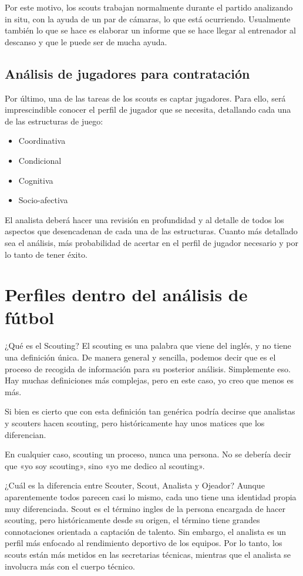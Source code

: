 Por este motivo, los scouts trabajan normalmente durante el partido analizando 
in situ, con la ayuda de un par de cámaras, lo que está 
ocurriendo. Usualmente también lo que se hace es elaborar un informe 
que se hace llegar al entrenador al descanso y que le puede ser 
de mucha ayuda.


\subsection{Análisis de jugadores para contratación}

Por último, una de las tareas de los scouts es captar jugadores. 
Para ello, será imprescindible conocer el perfil de jugador que 
se necesita, detallando cada una de las estructuras de juego:

\begin{itemize}
    \item Coordinativa
    \item Condicional
    \item Cognitiva
    \item Socio-afectiva
\end{itemize}

El analista deberá hacer una revisión en profundidad y al detalle de 
todos los aspectos que desencadenan de cada una de las estructuras. 
Cuanto más detallado sea el análisis, más probabilidad de acertar 
en el perfil de jugador necesario y por lo tanto de tener éxito.

\section{Perfiles dentro del análisis de fútbol}
¿Qué es el Scouting?
El scouting es una palabra que viene del inglés, y no tiene una definición 
única. De manera general y sencilla, podemos decir  que es el proceso de 
recogida de información para su posterior análisis. Simplemente eso. Hay 
muchas definiciones más complejas, pero en este caso, yo creo que menos 
es más.

Si bien es cierto que con esta definición tan genérica podría decirse 
que analistas y scouters hacen scouting, pero históricamente hay unos 
matices que los diferencian.

En cualquier caso, scouting un proceso, nunca una persona. No se debería 
decir que «yo soy scouting», sino «yo me dedico al scouting».

¿Cuál es la diferencia entre Scouter, Scout, Analista y Ojeador?
Aunque aparentemente todos parecen casi lo mismo, cada uno tiene una 
identidad propia muy diferenciada. Scout es el término ingles de la 
persona encargada de hacer scouting, pero históricamente desde su 
origen, el término tiene grandes connotaciones orientada a captación 
de talento. Sin embargo, el analista es un perfil más enfocado al 
rendimiento deportivo de los equipos. Por lo tanto, los scouts están 
más metidos en las secretarias técnicas, mientras que el analista 
se involucra más con el cuerpo técnico.

